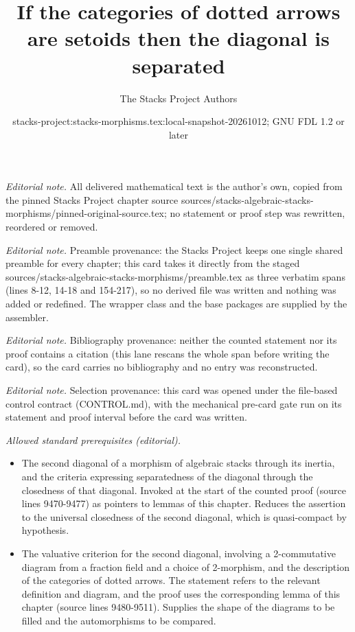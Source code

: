 \documentclass[10pt,a4paper]{amsart}
\title{If the categories of dotted arrows are setoids then the diagonal is separated}
\author{The Stacks Project Authors}
\date{stacks-project:stacks-morphisms.tex:local-snapshot-20261012; GNU FDL 1.2 or later}
\theoremstyle{plain}
\theoremstyle{definition}
\theoremstyle{remark}
\numberwithin{equation}{subsection}
\begin{document}
\maketitle
\noindent\textit{Editorial note.} All delivered mathematical text is the author's own, copied from the pinned Stacks Project chapter source sources/stacks-algebraic-stacks-morphisms/pinned-original-source.tex; no statement or proof step was rewritten, reordered or removed.\par\medskip
\noindent\textit{Editorial note.} Preamble provenance: the Stacks Project keeps one single shared preamble for every chapter; this card takes it directly from the staged sources/stacks-algebraic-stacks-morphisms/preamble.tex as three verbatim spans (lines 8-12, 14-18 and 154-217), so no derived file was written and nothing was added or redefined. The wrapper class and the base packages are supplied by the assembler.\par\medskip
\noindent\textit{Editorial note.} Bibliography provenance: neither the counted statement nor its proof contains a citation (this lane rescans the whole span before writing the card), so the card carries no bibliography and no entry was reconstructed.\par\medskip
\noindent\textit{Editorial note.} Selection provenance: this card was opened under the file-based control contract (CONTROL.md), with the mechanical pre-card gate run on its statement and proof interval before the card was written.\par\medskip
\noindent\textit{Allowed standard prerequisites (editorial).}\begin{itemize}
\item The second diagonal of a morphism of algebraic stacks through its inertia, and the criteria expressing separatedness of the diagonal through the closedness of that diagonal. Invoked at the start of the counted proof (source lines 9470-9477) as pointers to lemmas of this chapter. Reduces the assertion to the universal closedness of the second diagonal, which is quasi-compact by hypothesis.
\item The valuative criterion for the second diagonal, involving a 2-commutative diagram from a fraction field and a choice of 2-morphism, and the description of the categories of dotted arrows. The statement refers to the relevant definition and diagram, and the proof uses the corresponding lemma of this chapter (source lines 9480-9511). Supplies the shape of the diagrams to be filled and the automorphisms to be compared.
\end{itemize}\medskip
\end{document}
